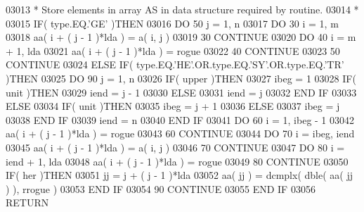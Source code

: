 \begin{DoxyCode}
03013 \textcolor{comment}{*     Store elements in array AS in data structure required by routine.}
03014 \textcolor{comment}{*}
03015       \textcolor{keywordflow}{IF}( type.EQ.\textcolor{stringliteral}{'GE'} )\textcolor{keywordflow}{THEN}
03016          \textcolor{keywordflow}{DO} 50 j = 1, n
03017             \textcolor{keywordflow}{DO} 30 i = 1, m
03018                aa( i + ( j - 1 )*lda ) = a( i, j )
03019    30       \textcolor{keywordflow}{CONTINUE}
03020             \textcolor{keywordflow}{DO} 40 i = m + 1, lda
03021                aa( i + ( j - 1 )*lda ) = rogue
03022    40       \textcolor{keywordflow}{CONTINUE}
03023    50    \textcolor{keywordflow}{CONTINUE}
03024       \textcolor{keywordflow}{ELSE} \textcolor{keywordflow}{IF}( type.EQ.\textcolor{stringliteral}{'HE'}.OR.type.EQ.\textcolor{stringliteral}{'SY'}.OR.type.EQ.\textcolor{stringliteral}{'TR'} )\textcolor{keywordflow}{THEN}
03025          \textcolor{keywordflow}{DO} 90 j = 1, n
03026             \textcolor{keywordflow}{IF}( upper )\textcolor{keywordflow}{THEN}
03027                ibeg = 1
03028                \textcolor{keywordflow}{IF}( unit )\textcolor{keywordflow}{THEN}
03029                   iend = j - 1
03030                \textcolor{keywordflow}{ELSE}
03031                   iend = j
03032 \textcolor{keywordflow}{               END IF}
03033             \textcolor{keywordflow}{ELSE}
03034                \textcolor{keywordflow}{IF}( unit )\textcolor{keywordflow}{THEN}
03035                   ibeg = j + 1
03036                \textcolor{keywordflow}{ELSE}
03037                   ibeg = j
03038 \textcolor{keywordflow}{               END IF}
03039                iend = n
03040 \textcolor{keywordflow}{            END IF}
03041             \textcolor{keywordflow}{DO} 60 i = 1, ibeg - 1
03042                aa( i + ( j - 1 )*lda ) = rogue
03043    60       \textcolor{keywordflow}{CONTINUE}
03044             \textcolor{keywordflow}{DO} 70 i = ibeg, iend
03045                aa( i + ( j - 1 )*lda ) = a( i, j )
03046    70       \textcolor{keywordflow}{CONTINUE}
03047             \textcolor{keywordflow}{DO} 80 i = iend + 1, lda
03048                aa( i + ( j - 1 )*lda ) = rogue
03049    80       \textcolor{keywordflow}{CONTINUE}
03050             \textcolor{keywordflow}{IF}( her )\textcolor{keywordflow}{THEN}
03051                jj = j + ( j - 1 )*lda
03052                aa( jj ) = dcmplx( dble( aa( jj ) ), rrogue )
03053 \textcolor{keywordflow}{            END IF}
03054    90    \textcolor{keywordflow}{CONTINUE}
03055 \textcolor{keywordflow}{      END IF}
03056       \textcolor{keywordflow}{RETURN}

\end{DoxyCode}
